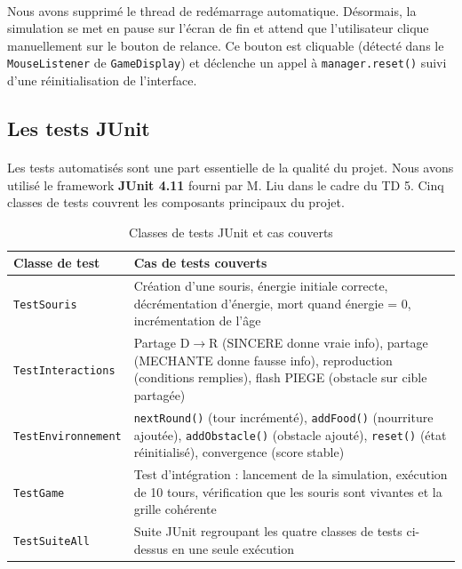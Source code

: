 \paragraph{} Nous avons supprimé le thread de redémarrage automatique. Désormais, la simulation se met en pause sur l'écran de fin et attend que l'utilisateur clique manuellement sur le bouton de relance. Ce bouton est cliquable (détecté dans le \texttt{MouseListener} de \texttt{GameDisplay}) et déclenche un appel à \texttt{manager.reset()} suivi d'une réinitialisation de l'interface.

\bigskip

\subsection{Les tests JUnit}

\paragraph{} Les tests automatisés sont une part essentielle de la qualité du projet. Nous avons utilisé le framework \textbf{JUnit 4.11} fourni par M. Liu dans le cadre du TD 5. Cinq classes de tests couvrent les composants principaux du projet.

\begin{table}[h!]
\centering
\renewcommand{\arraystretch}{1.4}
\begin{tabular}{|l|p{8.5cm}|}
\hline
\textbf{Classe de test} & \textbf{Cas de tests couverts} \\
\hline
\texttt{TestSouris} & Création d'une souris, énergie initiale correcte, décrémentation d'énergie, mort quand énergie = 0, incrémentation de l'âge \\
\hline
\texttt{TestInteractions} & Partage D$\rightarrow$R (SINCERE donne vraie info), partage (MECHANTE donne fausse info), reproduction (conditions remplies), flash PIEGE (obstacle sur cible partagée) \\
\hline
\texttt{TestEnvironnement} & \texttt{nextRound()} (tour incrémenté), \texttt{addFood()} (nourriture ajoutée), \texttt{addObstacle()} (obstacle ajouté), \texttt{reset()} (état réinitialisé), convergence (score stable) \\
\hline
\texttt{TestGame} & Test d'intégration : lancement de la simulation, exécution de 10 tours, vérification que les souris sont vivantes et la grille cohérente \\
\hline
\texttt{TestSuiteAll} & Suite JUnit regroupant les quatre classes de tests ci-dessus en une seule exécution \\
\hline
\end{tabular}
\caption{Classes de tests JUnit et cas couverts}
\label{tab:tests}
\end{table}

